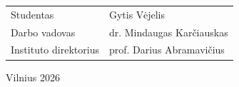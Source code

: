 \documentclass[12pt]{article}
\providecommand{\tabularnewline}{\\}
\begin{document}
\begin{center}
\vspace{3.5cm}
\par\end{center}

\begin{tabular*}{0.9\textwidth}{@{\extracolsep{\fill}}ll}
Studentas & Gytis Vėjelis\tabularnewline[0.5cm]
Darbo vadovas & dr. Mindaugas Karčiauskas\tabularnewline[0.5cm]
Instituto direktorius & prof. Darius Abramavičius\tabularnewline
\end{tabular*}
\begin{center}
\vfill{}
\par\end{center}

\begin{center}
Vilnius 2026
\par\end{center}

\newpage{}
\normalfont\tableofcontents{}

\newpage{}













\end{document}

